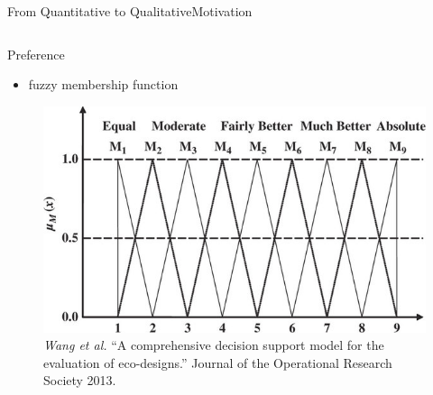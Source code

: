 \begin{frame}{From Quantitative to Qualitative}{Motivation}
\begin{columns}
\begin{block}{ Preference }
\begin{minipage}[t][4cm][t]{\textwidth}
\begin{itemize}
\item fuzzy membership function
\end{itemize}
\begin{figure}
	\centering
	\includegraphics[width=.9\linewidth]{figure/membership_func}
	\caption{ \tiny{ {\it Wang et al. } ``A comprehensive decision support model for the evaluation of eco-designs.'' Journal of the Operational Research Society 2013. } }
\end{figure}

\end{minipage}
\end{block}	
\end{columns}

\end{frame}

